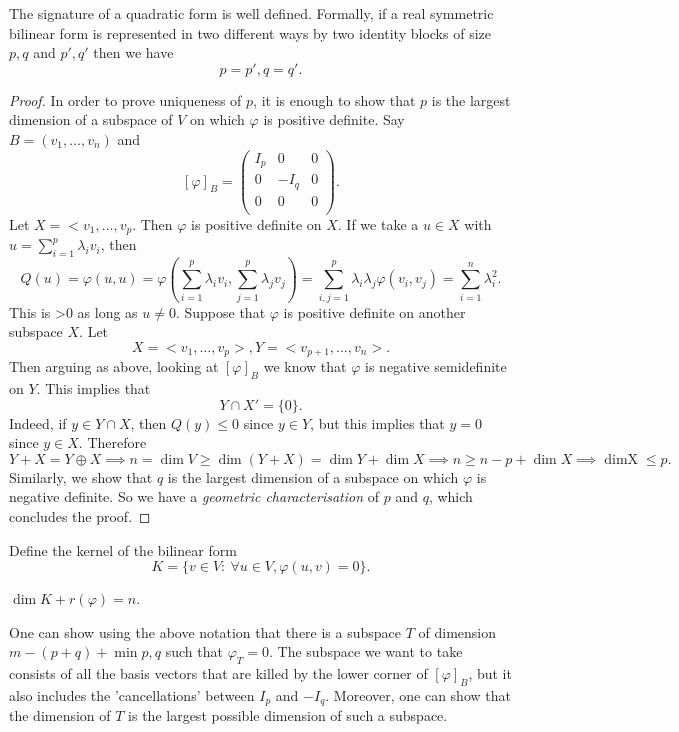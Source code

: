 \documentclass[a4paper]{scrartcl}
\begin{document}
\begin{theorem}
    The signature of a quadratic form is well defined. \newline 
     Formally, if a real symmetric bilinear form is represented in two different ways by two identity blocks of size $p,q$ and $p',q'$ then we have 
     \[p=p',q=q'.\]
\end{theorem}
\begin{proof}
     In order to prove uniqueness of $p$, it is enough to show that $p$ is the largest dimension of a subspace of $V$ on which $\varphi $ is positive definite. Say $B=(v_1, \ldots , v_n)$ and 
     \[[\varphi]_B=\left(
          \begin{array}{c|c|c}
           I_p &0&0\\
           \hline
           0 &-I_q&0\\
           \hline
           0 &0&0\\
           \end{array}
           \right).\]
     Let $X=<v_1,\ldots ,v_p$. Then $\varphi $ is positive definite on $X$. If we take a $u \in X$ with $u=\sum_{i=1}^{p}\lambda_i v_i$, then 
     \[Q(u)= \varphi (u,u)=\varphi(\sum_{i=1}^{p}\lambda_i v_i,\sum_{j=1}^{p}\lambda_j v_j)=\sum_{i,j=1}^{p}\lambda_i \lambda_j \varphi (v_i,v_j)= \sum_{i=1}^{n} \lambda_i^2 .\]
     This is >0 as long as $u \neq 0$. Suppose that $\varphi $ is positive definite on another subspace $X$. Let 
     \[X=<v_1,\ldots ,v_p> , Y=<v_{p+1},\ldots ,v_n>.\]
     Then arguing as above, looking at $[\varphi]_B$ we know that $\varphi$ is negative semidefinite on $Y$. This implies that 
     \[Y \cap X'=\{0\}.\] Indeed, if $y \in Y \cap X$, then $Q(y)\leq 0$ since $y \in Y$, but this implies that $y=0$ since $y \in X$. Therefore 
     \[Y+X= Y \oplus X \implies n=\operatorname{dim} V \geq \operatorname{dim} (Y+X) =\operatorname{dim}Y +\operatorname{dim}X \implies n \geq n-p+\operatorname{dim}X \implies \operatorname{dim X} \leq p.\]
     Similarly, we show that $q$ is the largest dimension of a subspace on which $\varphi$ is negative definite. So we have a \emph{geometric characterisation} of $p$ and $q$, which concludes the proof.
\end{proof}

\begin{definition}
     Define the kernel of the bilinear form
     \[K=\{v \in V : \ \forall u \in V, \varphi (u,v)=0 \}.\]
\end{definition}
\begin{remark}
     $\operatorname{dim} K + r (\varphi)=n$.
\end{remark}
One can show using the above notation that there is a subspace $T$ of dimension $m-(p+q)+\min p,q$ such that $\varphi_T=0$. The subspace we want to take consists of all the basis vectors that are killed by the lower corner of $[\varphi]_B$, but it also includes the 'cancellations' between $I_p$ and $-I_q$.\newline 
Moreover, one can show that the dimension of $T$ is the largest possible dimension of such a subspace.
\end{document}
